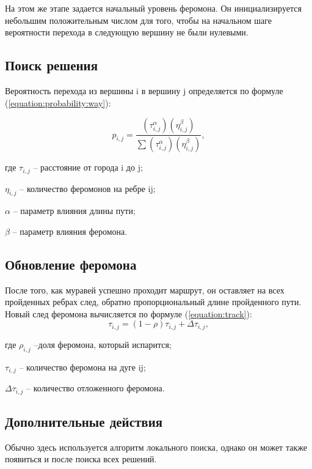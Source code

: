             На этом же этапе задается начальный уровень феромона. 
            Он инициализируется небольшим положительным числом для того, 
            чтобы на начальном шаге вероятности перехода в следующую вершину не были нулевыми.
            
        \subsection{Поиск решения}
            Вероятность перехода из вершины i в вершину j определяется по формуле (\ref{equation:probability:way}):
            
            \begin{equation}
                p_{i,j}={\frac{(\tau_{i,j}^{\alpha })(\eta_{i,j}^{\beta})}{\sum(\tau_{i,j}^{\alpha})(\eta_{i,j}^{\beta})}},
                \label{equation:probability:way} 
            \end{equation}
                
            где $\tau_{i,j}$ -- расстояние от города i до j;
                
            $\eta_{i,j}$ -- количество феромонов на ребре ij;
            
            $\alpha$ -- параметр влияния длины пути;
            
            $\beta$ -- параметр влияния феромона.
        
        
        \subsection{Обновление феромона}
            После того, как муравей успешно проходит маршрут, 
            он оставляет на всех пройденных ребрах след, 
            обратно пропорциональный длине пройденного пути. 
            Новый след феромона вычисляется по формуле (\ref{equation:track}):
            \begin{equation}
                \tau _{i,j}=(1-\rho)\tau_{i,j}+\Delta\tau_{i,j},
                \label{equation:track} 
            \end{equation}
            
            где $ \rho_{i,j}$ --доля феромона, который испарится;
            
            $\tau_{i,j}$ -- количество феромона на дуге ij;
                
            $\Delta\tau_{i,j}$ -- количество отложенного феромона.
            
        \subsection{Дополнительные действия} 
            Обычно здесь используется алгоритм локального поиска,
            однако он может также появиться и после поиска всех решений. 
        
